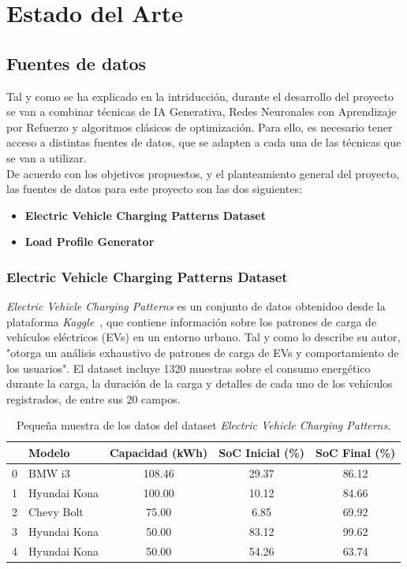 \chapter{Estado del Arte}
\section{Fuentes de datos}
Tal y como se ha explicado en la intriducción, durante el desarrollo del proyecto se van a combinar
técnicas de IA Generativa, Redes Neuronales con Aprendizaje por Refuerzo y algoritmos clásicos de 
optimización. Para ello, es necesario tener acceso a distintas fuentes de datos, que se adapten
a cada una de las técnicas que se van a utilizar.\\

De acuerdo con los objetivos propuestos, y el planteamiento general del proyecto, las fuentes de 
datos para este proyecto son las dos siguientes:
\begin{itemize}
    \item \textbf{Electric Vehicle Charging Patterns Dataset}
    \item \textbf{Load Profile Generator}
\end{itemize}

\subsection{Electric Vehicle Charging Patterns Dataset}
\textit{Electric Vehicle Charging Patterns} es un conjunto de datos obtenidoo desde la plataforma
\textit{Kaggle}~\cite{kaggle_ev_charging_patterns}, que contiene información sobre los patrones de 
carga de vehículos eléctricos (EVs) en un entorno urbano. Tal y como lo describe su autor, "otorga 
un análisis exhaustivo de patrones de carga de EVs y comportamiento de los usuarios". El dataset 
incluye 1320 muestras sobre el consumo energético durante la carga, la duración de la carga y 
detalles de cada uno de los vehículos registrados, de entre sus 20 campos.\\
\vfill
\begin{table}[ht]
\begingroup
\centering
\setlength{\tabcolsep}{6pt}
\begin{tabular}{c|l c c c}
 & Modelo & Capacidad (kWh) & SoC Inicial (\%) & SoC Final (\%) \\
\hline
0 & BMW i3 & 108.46 & 29.37 & 86.12 \\
1 & Hyundai Kona & 100.00 & 10.12 & 84.66 \\
2 & Chevy Bolt & 75.00 & 6.85 & 69.92 \\
3 & Hyundai Kona & 50.00 & 83.12 & 99.62 \\
4 & Hyundai Kona & 50.00 & 54.26 & 63.74 \\
\end{tabular}
\caption{Pequeña muestra de los datos del dataset \textit{Electric Vehicle Charging Patterns}.}
\label{tab:ev_charging_patterns_example}
\endgroup
\end{table}


